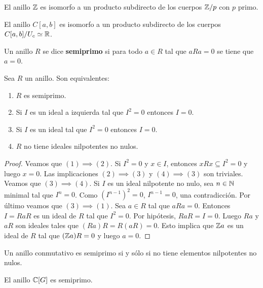 \begin{example}
	El anillo $\mathbb{Z}$ es isomorfo a un producto subdirecto de los cuerpos $\mathbb{Z}/p$
	con $p$ primo.
\end{example}

\begin{example}
	El anillo $C[a,b]$ es isomorfo a un producto subdirecto de los cuerpos
	$C[a,b]/U_c\simeq\mathbb{R}$.
\end{example}

\begin{definition}
	Un anillo $R$ se dice \textbf{semiprimo} si para todo $a\in R$ tal que
	$aRa=0$ se tiene que $a=0$.
\end{definition}

\begin{lemma}
	Sea $R$ un anillo. Son equivalentes:
	\begin{enumerate}
		\item $R$ es semiprimo.
		\item Si $I$ es un ideal a izquierda tal que $I^2=0$ entonces $I=0$.
		\item Si $I$ es un ideal tal que $I^2=0$ entonces $I=0$.
		\item $R$ no tiene ideales nilpotentes no nulos. 
	\end{enumerate}
\end{lemma}

\begin{proof}
	Veamos que $(1)\implies(2)$. Si $I^2=0$ y $x\in I$, entonces $xRx\subseteq I^2=0$ y
	luego $x=0$. Las implicaciones $(2)\implies(3)$ y $(4)\implies(3)$ son triviales. Veamos que
	$(3)\implies(4)$.  Si $I$ es un ideal nilpotente no nulo, sea $n\in\mathbb{N}$
	minimal tal que $I^n=0$.  Como $(I^{n-1})^2=0$, $I^{n-1}=0$, una
	contradicción. Por último veamos que $(3)\implies(1)$. Sea $a\in R$ tal que
	$aRa=0$. Entonces $I=RaR$ es un ideal de $R$ tal que $I^2=0$. Por hipótesis, $RaR=I=0$. Luego
	$Ra$ y $aR$ son ideales tales que $(Ra)R=R(aR)=0$. Esto implica que $\mathbb{Z} a$ es un ideal de $R$
	tal que $(\mathbb{Z} a)R=0$ y luego $a=0$.
\end{proof}

\begin{example}
	Un anillo conmutativo es semiprimo si y sólo si no tiene elementos
	nilpotentes no nulos.
\end{example}


\begin{proposition}
	El anillo $\mathbb{C}[G]$ es semiprimo.
\end{proposition}

